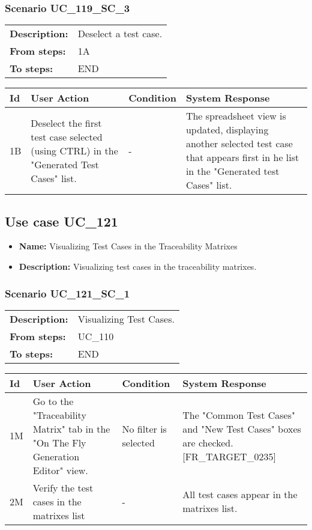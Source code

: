 \documentclass[a4paper,11pt]{article}
\newcommand{\bl}{\\ \hline}
\begin{document}
\subsubsection*{Scenario UC_119_SC_3}
\begin{tabular}{p{1in}p{4in}}
{\bf Description:} & Deselect a test case. \\
{\bf From steps:} & 1A \\
{\bf To steps:} & END \\
\end{tabular}
 
\begin{tabular}{|p{0.8in}|p{1.6in}|p{1.6in}|p{1.6in}|}
\hline
Id & User Action & Condition & System Response  \bl 
1B & Deselect the first test case selected (using CTRL) in the "Generated Test Cases" list. & - & The spreadsheet view is updated, displaying another selected test case that appears first in he list in the "Generated test Cases" list. \bl 
\end{tabular}
\subsection*{Use case UC_121}
\begin{itemize}
\item {\bf Name: }Visualizing Test Cases in the Traceability Matrixes
\item {\bf Description: }Visualizing test cases in the traceability matrixes.
\end{itemize}
\subsubsection*{Scenario UC_121_SC_1}
\begin{tabular}{p{1in}p{4in}}
{\bf Description:} & Visualizing Test Cases. \\
{\bf From steps:} & UC_110#2M \\
{\bf To steps:} & END \\
\end{tabular}
 
\begin{tabular}{|p{0.8in}|p{1.6in}|p{1.6in}|p{1.6in}|}
\hline
Id & User Action & Condition & System Response  \bl 
1M & Go to the "Traceability Matrix" tab in the "On The Fly Generation Editor" view. & No filter is selected & The "Common Test Cases" and "New Test Cases" boxes are checked. [FR_TARGET_0235] \bl 
2M & Verify the test cases in the matrixes list & - & All test cases appear in the matrixes list. \bl 
\end{tabular}
\end{document}
